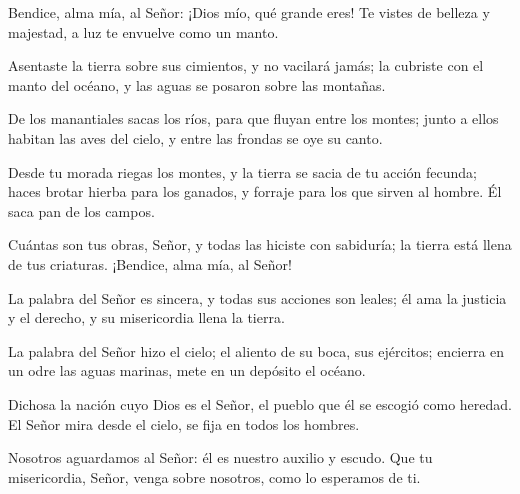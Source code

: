 
 


\begin{psbody}
Bendice, alma mía, al Señor: 
¡Dios mío, qué grande eres! 
Te vistes de belleza y majestad, 
a luz te envuelve como un manto. 

Asentaste la tierra sobre sus cimientos, 
y no vacilará jamás; 
la cubriste con el manto del océano, 
y las aguas se posaron sobre las montañas. 

De los manantiales sacas los ríos, 
para que fluyan entre los montes; 
junto a ellos habitan las aves del cielo, 
y entre las frondas se oye su canto. 

Desde tu morada riegas los montes, 
y la tierra se sacia de tu acción fecunda; 
haces brotar hierba para los ganados, 
y forraje para los que sirven al hombre. 
Él saca pan de los campos.
 
Cuántas son tus obras, Señor, 
y todas las hiciste con sabiduría; 
la tierra está llena de tus criaturas. 
¡Bendice, alma mía, al Señor! 
\end{psbody}

\newpage 


 


\begin{psbody}
La palabra del Señor es sincera, 
y todas sus acciones son leales; 
él ama la justicia y el derecho, 
y su misericordia llena la tierra. 

La palabra del Señor hizo el cielo; 
el aliento de su boca, sus ejércitos; 
encierra en un odre las aguas marinas, 
mete en un depósito el océano.

Dichosa la nación cuyo Dios es el Señor, 
el pueblo que él se escogió como heredad. 
El Señor mira desde el cielo, 
se fija en todos los hombres. 

Nosotros aguardamos al Señor: 
él es nuestro auxilio y escudo. 
Que tu misericordia, Señor, venga sobre nosotros, 
como lo esperamos de ti. 
\end{psbody}


